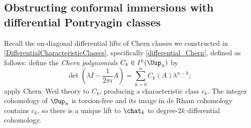\subsection{Obstructing conformal immersions with differential Pontryagin classes}
\label{ssec:obstruct}


Recall the on-diagonal differential lifts of Chern classes we constructed in
\cref{DifferentialCharacteristicClasses}, specifically \cref{differential_Chern}, defined as follows: define the
\emph{Chern polynomials} $C_k\in I^k(\Uup_n)$ by 
\begin{equation}
	\det(\lambda I - \frac{1}{2\pi i}A) = \sum_{k=0} ^n C_k(A)\lambda^{n-k};
\end{equation}
apply Chern--Weil theory to $C_k$, producing a characteristic class $c_k$. The integer
cohomology of $\Uup_n$ is torsion-free \cite[\S 29]{Bor53} and its image in de Rham cohomology contains $c_k$,
so there is a unique lift to $\chat_k$ to degree-$2k$ differential cohomology.


